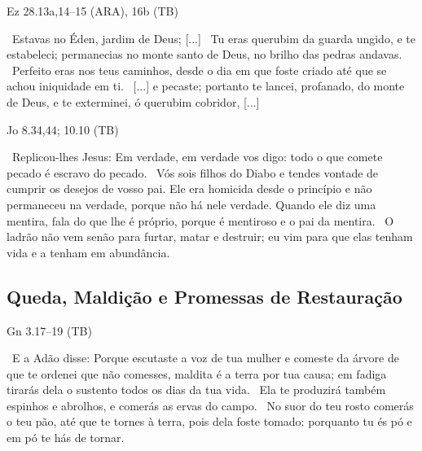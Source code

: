 \documentclass[12pt,aspectratio=169]{beamer}
\newcommand{\ver}[1]{%
    \raisebox{0.50ex}{%
        \scalebox{1.1}{%
            \pmb{\textbf{\textcolor{BSpbg}{#1}}}%
        }%
    }%
}
\newcommand{\QUOTE}[1]{%
    \par\noindent\hspace*{0.05\linewidth}%
    \begin{minipage}{0.9\linewidth}%
        \linespread{1.35}\large{#1}%
    \end{minipage}%
}
\newcommand{\RED}[1]{{\textcolor{TXred}{#1}}}
\newcommand{\YEL}[1]{{\textcolor{TXyel}{#1}}}
\begin{document}
    \begin{frame}{Ez 28.13a,14--15 (ARA), 16b (TB)}
        \QUOTE{%
            \ver{13}~\YEL{Estavas no Éden}, jardim de Deus; [...]
            \ver{14}~Tu eras \YEL{querubim} da \YEL{guarda} ungido, e te \YEL{estabeleci};
            permanecias no monte santo de Deus, no brilho das pedras andavas.
            \ver{15}~\YEL{Perfeito} eras nos teus caminhos, desde o dia em que foste
            \YEL{criado} até que se achou \RED{iniquidade} em ti.
            \ver{16}~[...] e \RED{pecaste}; portanto te \RED{lancei, profanado}, do monte de
            Deus, e te exterminei, ó \YEL{querubim} cobridor, [...]
        }
    \end{frame}

    \begin{frame}{Jo 8.34,44; 10.10 (TB)}
        \QUOTE{%
            \ver{8.34}~Replicou-lhes Jesus: Em verdade, em verdade vos digo: \YEL{todo} o que
            comete \RED{pecado} é \RED{escravo do pecado}.
            \ver{8.44}~Vós sois filhos do \RED{Diabo} e tendes vontade de cumprir os
            \RED{desejos} de vosso pai. Ele era \RED{homicida desde o princípio} e não
            permaneceu na verdade, porque não há nele verdade. Quando ele diz uma mentira, fala
            do que lhe é próprio, porque é \RED{mentiroso} e o pai da mentira.
            \ver{10.10}~O ladrão não vem senão para \RED{furtar, matar e destruir}; eu vim para
            que elas tenham vida e a tenham em abundância.
        }
    \end{frame}

    \subsection{Queda, Maldição e Promessas de Restauração}

    \begin{frame}{Gn 3.17--19 (TB)}
        \QUOTE{%
            \ver{17}~E a Adão disse: Porque escutaste a voz de tua mulher e comeste da árvore de
            que te ordenei que não comesses, \RED{maldita é a terra por tua causa}; em fadiga
            tirarás dela o sustento todos os \RED{dias da tua vida}.
            \ver{18}~Ela te produzirá também \RED{espinhos e abrolhos}, e comerás as ervas do
            campo.
            \ver{19}~No \RED{suor do teu rosto comerás o teu pão}, até que te tornes à terra,
            pois dela foste tomado: porquanto \RED{tu és pó e em pó te hás de tornar}.
        }
    \end{frame}
\end{document}
